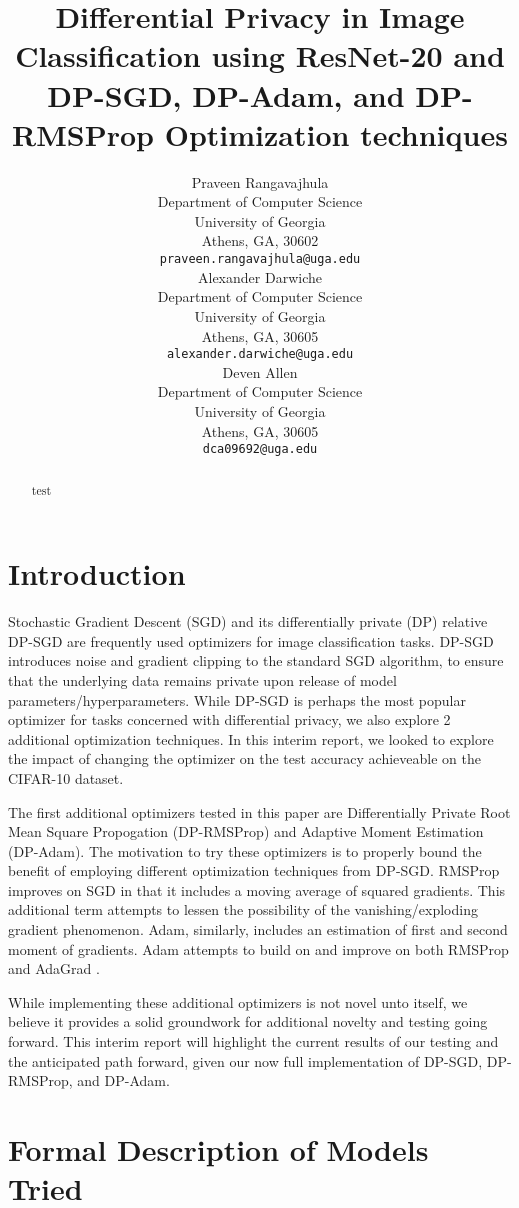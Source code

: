 \documentclass{article}
\title{Differential Privacy in Image Classification using ResNet-20 and DP-SGD, DP-Adam, and DP-RMSProp Optimization techniques}
\author{
    Praveen Rangavajhula\\
    Department of Computer Science\\
    University of Georgia\\
    Athens, GA, 30602\\
    \texttt{praveen.rangavajhula@uga.edu} \\
    \And
    Alexander Darwiche\\
    Department of Computer Science\\
    University of Georgia\\
    Athens, GA, 30605 \\
    \texttt{alexander.darwiche@uga.edu} \\
    \And
    Deven Allen\\
    Department of Computer Science\\
    University of Georgia\\
    Athens, GA, 30605 \\
    \texttt{dca09692@uga.edu} \\
}
\begin{document}
    \maketitle
    \begin{abstract}
    test

    \end{abstract}


    \section{Introduction}\label{sec:introduction}
    
    Stochastic Gradient Descent (SGD) and its differentially private (DP) relative DP-SGD are frequently used optimizers for image classification tasks. DP-SGD
    introduces noise and gradient clipping to the standard SGD algorithm, to ensure that the underlying data remains private upon release of model parameters/hyperparameters. While DP-SGD
    is perhaps the most popular optimizer for tasks concerned with differential privacy, we also explore 2 additional optimization techniques. In this interim report, 
    we looked to explore the impact of changing the optimizer on the test accuracy achieveable on the CIFAR-10 dataset.
  
    The first additional optimizers tested in this paper are Differentially Private Root Mean Square Propogation (DP-RMSProp) and Adaptive Moment Estimation (DP-Adam). The motivation to try these optimizers is to properly bound
    the benefit of employing different optimization techniques from DP-SGD. RMSProp improves on SGD in that it includes a moving average of squared gradients. This additional term attempts to lessen the possibility of the
    vanishing/exploding gradient phenomenon. Adam, similarly, includes an estimation of first and second moment of gradients. Adam attempts to build on and improve on both RMSProp and AdaGrad \cite{kingma2017adammethodstochasticoptimization}.

    While implementing these additional optimizers is not novel unto itself, we believe it provides a solid groundwork for additional novelty and testing going forward. This interim report will
    highlight the current results of our testing and the anticipated path forward, given our now full implementation of DP-SGD, DP-RMSProp, and DP-Adam.

    \section{Formal Description of Models Tried}\label{sec:models}
    
\end{document}
